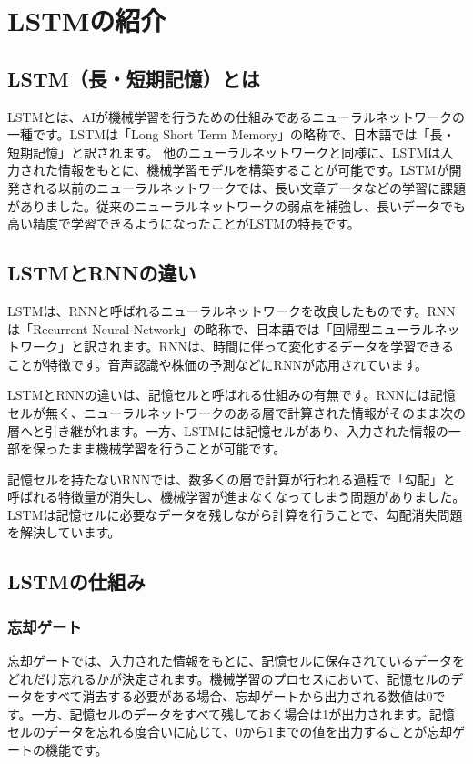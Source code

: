 \documentclass[a4paper,11pt]{jsarticle}
\begin{document}
  

\section{LSTMの紹介}
\subsection{LSTM（長・短期記憶）とは}
LSTMとは、AIが機械学習を行うための仕組みであるニューラルネットワークの一種です。LSTMは「Long Short Term Memory」の略称で、日本語では「長・短期記憶」と訳されます。
他のニューラルネットワークと同様に、LSTMは入力された情報をもとに、機械学習モデルを構築することが可能です。LSTMが開発される以前のニューラルネットワークでは、長い文章データなどの学習に課題がありました。従来のニューラルネットワークの弱点を補強し、長いデータでも高い精度で学習できるようになったことがLSTMの特長です。
\subsection{LSTMとRNNの違い}
LSTMは、RNNと呼ばれるニューラルネットワークを改良したものです。RNNは「Recurrent Neural Network」の略称で、日本語では「回帰型ニューラルネットワーク」と訳されます。RNNは、時間に伴って変化するデータを学習できることが特徴です。音声認識や株価の予測などにRNNが応用されています。

LSTMとRNNの違いは、記憶セルと呼ばれる仕組みの有無です。RNNには記憶セルが無く、ニューラルネットワークのある層で計算された情報がそのまま次の層へと引き継がれます。一方、LSTMには記憶セルがあり、入力された情報の一部を保ったまま機械学習を行うことが可能です。

記憶セルを持たないRNNでは、数多くの層で計算が行われる過程で「勾配」と呼ばれる特徴量が消失し、機械学習が進まなくなってしまう問題がありました。LSTMは記憶セルに必要なデータを残しながら計算を行うことで、勾配消失問題を解決しています。
\subsection{LSTMの仕組み}
\subsubsection{忘却ゲート}
忘却ゲートでは、入力された情報をもとに、記憶セルに保存されているデータをどれだけ忘れるかが決定されます。機械学習のプロセスにおいて、記憶セルのデータをすべて消去する必要がある場合、忘却ゲートから出力される数値は0です。一方、記憶セルのデータをすべて残しておく場合は1が出力されます。記憶セルのデータを忘れる度合いに応じて、0から1までの値を出力することが忘却ゲートの機能です。
\end{document}
